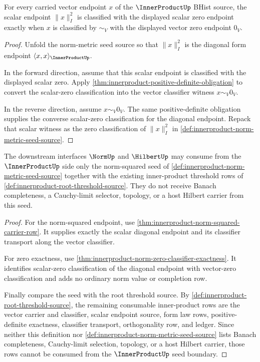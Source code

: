 \begin{theorem}
\label{thm:innerproduct-norm-zero-classifier-exactness}
For every carried vector endpoint $x$ of the $\InnerProductUp$ BHist source,
the scalar endpoint $\|x\|_{I}^{2}$ is classified with the displayed scalar
zero endpoint exactly when $x$ is classified by $\sim_V$ with the displayed
vector zero endpoint $0_V$.
\end{theorem}
\begin{proof}
Unfold the norm-metric seed source so that $\|x\|_{I}^{2}$ is the diagonal
form endpoint $\langle x,x\rangle_{\InnerProductUp}$.

In the forward direction, assume that this scalar endpoint is classified with
the displayed scalar zero. Apply
\autoref{thm:innerproduct-positive-definite-obligation} to convert the
scalar-zero classification into the vector classifier witness $x\sim_V 0_V$.

In the reverse direction, assume $x\sim_V 0_V$. The same positive-definite
obligation supplies the converse scalar-zero classification for the diagonal
endpoint. Repack that scalar witness as the zero classification of
$\|x\|_{I}^{2}$ in \autoref{def:innerproduct-norm-metric-seed-source}.
\end{proof}

\begin{theorem}
\label{thm:innerproduct-norm-metric-seed-downstream-boundary}
The downstream interfaces $\NormUp$ and $\HilbertUp$ may consume from the
$\InnerProductUp$ side only the norm-squared seed of
\autoref{def:innerproduct-norm-metric-seed-source} together with the existing
inner-product threshold rows of
\autoref{def:innerproduct-root-threshold-source}. They do not receive Banach
completeness, a Cauchy-limit selector, topology, or a host Hilbert carrier
from this seed.
\end{theorem}
\begin{proof}
For the norm-squared endpoint, use
\autoref{thm:innerproduct-norm-squared-carrier-row}. It supplies exactly the
scalar diagonal endpoint and its classifier transport along the vector
classifier.

For zero exactness, use
\autoref{thm:innerproduct-norm-zero-classifier-exactness}. It identifies
scalar-zero classification of the diagonal endpoint with vector-zero
classification and adds no ordinary norm value or completion row.

Finally compare the seed with the root threshold source. By
\autoref{def:innerproduct-root-threshold-source}, the remaining consumable
inner-product rows are the vector carrier and classifier, scalar endpoint
source, form law rows, positive-definite exactness, classifier transport,
orthogonality row, and ledger. Since neither this definition nor
\autoref{def:innerproduct-norm-metric-seed-source} lists Banach completeness,
Cauchy-limit selection, topology, or a host Hilbert carrier, those rows cannot
be consumed from the $\InnerProductUp$ seed boundary.
\end{proof}

